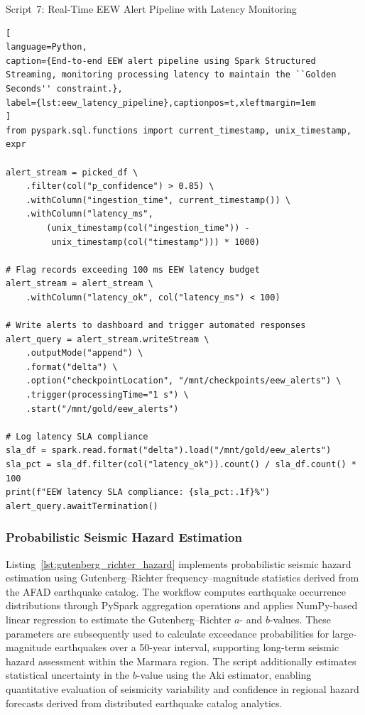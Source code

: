\documentclass[data,article,accept,pdftex,moreauthors]{Definitions/mdpi}
\begin{document}
Script~7: Real-Time EEW Alert Pipeline with Latency Monitoring

\begin{lstlisting}[
language=Python,
caption={End-to-end EEW alert pipeline using Spark Structured Streaming, monitoring processing latency to maintain the ``Golden Seconds'' constraint.},
label={lst:eew_latency_pipeline},captionpos=t,xleftmargin=1em
]
from pyspark.sql.functions import current_timestamp, unix_timestamp, expr

alert_stream = picked_df \
    .filter(col("p_confidence") > 0.85) \
    .withColumn("ingestion_time", current_timestamp()) \
    .withColumn("latency_ms",
        (unix_timestamp(col("ingestion_time")) -
         unix_timestamp(col("timestamp"))) * 1000)

# Flag records exceeding 100 ms EEW latency budget
alert_stream = alert_stream \
    .withColumn("latency_ok", col("latency_ms") < 100)

# Write alerts to dashboard and trigger automated responses
alert_query = alert_stream.writeStream \
    .outputMode("append") \
    .format("delta") \
    .option("checkpointLocation", "/mnt/checkpoints/eew_alerts") \
    .trigger(processingTime="1 s") \
    .start("/mnt/gold/eew_alerts")

# Log latency SLA compliance
sla_df = spark.read.format("delta").load("/mnt/gold/eew_alerts")
sla_pct = sla_df.filter(col("latency_ok")).count() / sla_df.count() * 100
print(f"EEW latency SLA compliance: {sla_pct:.1f}%")
alert_query.awaitTermination()
\end{lstlisting}

\subsubsection{Probabilistic Seismic Hazard Estimation}

Listing~\ref{lst:gutenberg_richter_hazard} implements probabilistic seismic hazard estimation using Gutenberg--Richter frequency--magnitude statistics derived from the AFAD earthquake catalog. The workflow computes earthquake occurrence distributions through PySpark aggregation operations and applies NumPy-based linear regression to estimate the Gutenberg--Richter $a$- and $b$-values. These parameters are subsequently used to calculate exceedance probabilities for large-magnitude earthquakes over a 50-year interval, supporting long-term seismic hazard assessment within the Marmara region. The script additionally estimates statistical uncertainty in the $b$-value using the Aki estimator, enabling quantitative evaluation of seismicity variability and confidence in regional hazard forecasts derived from distributed earthquake catalog analytics.
\end{document}
